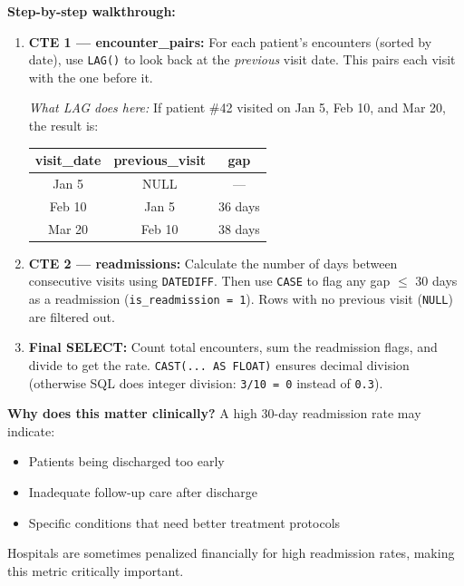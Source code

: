 \documentclass[12pt, a4paper, oneside]{report}
\begin{document}
\textbf{Step-by-step walkthrough:}

\begin{enumerate}[label=\textcolor{primary}{\textbf{Step \arabic*:}}]
    \item \textbf{CTE 1 --- encounter\_pairs:} For each patient's encounters (sorted by date), use \texttt{LAG()} to look back at the \textit{previous} visit date. This pairs each visit with the one before it.

    \textit{What LAG does here:} If patient \#42 visited on Jan 5, Feb 10, and Mar 20, the result is:
    \begin{center}
    \small
    \begin{tabular}{ccc}
        \toprule
        \textbf{visit\_date} & \textbf{previous\_visit} & \textbf{gap} \\
        \midrule
        Jan 5 & NULL & --- \\
        Feb 10 & Jan 5 & 36 days \\
        Mar 20 & Feb 10 & 38 days \\
        \bottomrule
    \end{tabular}
    \end{center}

    \item \textbf{CTE 2 --- readmissions:} Calculate the number of days between consecutive visits using \texttt{DATEDIFF}. Then use \texttt{CASE} to flag any gap $\leq$ 30 days as a readmission (\texttt{is\_readmission = 1}). Rows with no previous visit (\texttt{NULL}) are filtered out.

    \item \textbf{Final SELECT:} Count total encounters, sum the readmission flags, and divide to get the rate. \texttt{CAST(... AS FLOAT)} ensures decimal division (otherwise SQL does integer division: \texttt{3/10 = 0} instead of \texttt{0.3}).
\end{enumerate}

\begin{tipbox}
    \textbf{Why does this matter clinically?} A high 30-day readmission rate may indicate:
    \begin{itemize}
        \item Patients being discharged too early
        \item Inadequate follow-up care after discharge
        \item Specific conditions that need better treatment protocols
    \end{itemize}
    Hospitals are sometimes penalized financially for high readmission rates, making this metric critically important.
\end{tipbox}
\end{document}
